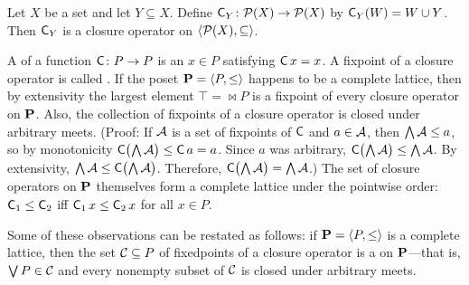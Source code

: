 \begin{example}
Let $X$ be a set and let $Y \subseteq X$.
Define $\operatorname{\mathsf{C}}_Y\colon \mathcal{P}(X) \to \mathcal{P}(X)$ by $\operatorname{\mathsf{C}}_Y (W) = W \cup Y$.
Then $\operatorname{\mathsf{C}}_Y$ is a closure operator on $\langle\mathcal{P}(X), \subseteq\rangle$.
\end{example}


A  of a
function $\operatorname{\mathsf{C}} \colon  P \to P$ is an $x\in P$ satisfying $\operatorname{\mathsf{C}} x = x$.
A fixpoint of a closure operator is called .
If the poset $\mathbf{P} = \langle P, \leq\rangle$ happens to be a complete lattice,
then by extensivity the largest element $\top = \Join P$ is
a fixpoint of every closure operator on $\mathbf{P}$.
Also, the collection of fixpoints of a closure operator is closed under arbitrary meets.
(Proof: If $\mathcal{A}$ is a set of fixpoints of $\operatorname{\mathsf{C}}$ and  
$a \in \mathcal{A}$, then $\bigwedge \mathcal{A} \leq a$, so by monotonicity
$\operatorname{\mathsf{C}} \bigl( \bigwedge \mathcal{A} \bigr) \leq \operatorname{\mathsf{C}} a = a$. 
Since $a$ was arbitrary,
$\operatorname{\mathsf{C}} \bigl( \bigwedge \mathcal{A} \bigr) \leq  \bigwedge \mathcal{A}$.
By extensivity,
$\bigwedge \mathcal{A} \leq \operatorname{\mathsf{C}} \bigl( \bigwedge \mathcal{A}\bigr)$. %
Therefore, $\operatorname{\mathsf{C}} \bigl( \bigwedge \mathcal{A} \bigr) =  \bigwedge \mathcal{A}$.)
The set of closure operators on $\mathbf{P}$
themselves form a complete lattice under the pointwise
order: $\operatorname{\mathsf{C}}_1 \leq  \operatorname{\mathsf{C}}_2$ iff $\operatorname{\mathsf{C}}_1 x \leq  \operatorname{\mathsf{C}}_2 x$ for all $x \in P$. 

Some of these observations can be restated as follows:
if $\mathbf{P} = \langle P, \leq\rangle$ is a complete lattice,
then the set $\mathcal{C} \subseteq P$ of fixedpoints of a closure operator
is a  on $\mathbf{P}$---that is, 
$\bigvee P \in \mathcal{C}$ and every nonempty subset of $\mathcal{C}$ is closed under arbitrary meets.


